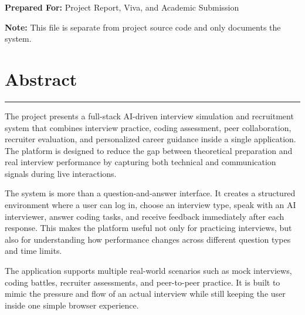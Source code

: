 ﻿\documentclass[12pt,a4paper]{article}
\newcommand{\sectionline}{\vspace{0.4em}\hrule\vspace{0.8em}}
\begin{document}
\begin{titlepage}
\begin{figure}[H]
{%
  }
  \end{figure}

  \vfill
  {\large\textbf{Prepared For:} Project Report, Viva, and Academic Submission\par}
  \vspace{0.2cm}
  {\large\textbf{Note:} This file is separate from project source code and only documents the system.\par}
\end{titlepage}

\tableofcontents
\clearpage

\section{Abstract}
\sectionline
The project presents a full-stack AI-driven interview simulation and recruitment system that combines interview practice, coding assessment, peer collaboration, recruiter evaluation, and personalized career guidance inside a single application. The platform is designed to reduce the gap between theoretical preparation and real interview performance by capturing both technical and communication signals during live interactions.

The system is more than a question-and-answer interface. It creates a structured environment where a user can log in, choose an interview type, speak with an AI interviewer, answer coding tasks, and receive feedback immediately after each response. This makes the platform useful not only for practicing interviews, but also for understanding how performance changes across different question types and time limits.

The application supports multiple real-world scenarios such as mock interviews, coding battles, recruiter assessments, and peer-to-peer practice. It is built to mimic the pressure and flow of an actual interview while still keeping the user inside one simple browser experience.
\end{document}
